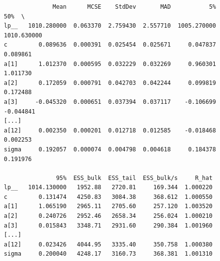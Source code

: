 \begin{frame}[fragile]
\scriptsize
\begin{verbatim}
              Mean      MCSE    StdDev       MAD           5%          50%  \
lp__   1010.280000  0.063370  2.759430  2.557710  1005.270000  1010.630000   
c         0.089636  0.000391  0.025454  0.025671     0.047837     0.089861   
a[1]      1.012370  0.000595  0.032229  0.032269     0.960301     1.011730   
a[2]      0.172059  0.000791  0.042703  0.042244     0.099819     0.172488   
a[3]     -0.045320  0.000651  0.037394  0.037117    -0.106699    -0.044841   
[...]
a[12]     0.002350  0.000201  0.012718  0.012585    -0.018468     0.002253   
sigma     0.192057  0.000074  0.004798  0.004618     0.184378     0.191976   

               95%  ESS_bulk  ESS_tail  ESS_bulk/s     R_hat  
lp__   1014.130000   1952.88   2720.81     169.344  1.000220  
c         0.131474   4250.83   3084.38     368.612  1.000550  
a[1]      1.065190   2965.11   2705.60     257.120  1.003520  
a[2]      0.240726   2952.46   2658.34     256.024  1.000210  
a[3]      0.015843   3348.71   2931.60     290.384  1.001960  
[...]
a[12]     0.023426   4044.95   3335.40     350.758  1.000380  
sigma     0.200040   4248.17   3160.73     368.381  1.001310
\end{verbatim}
%
\end{frame}



